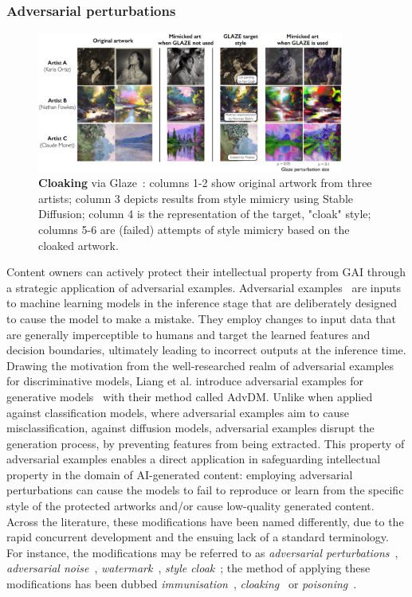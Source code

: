 \documentclass[conference,table]{IEEEtran}
\begin{document}
\subsubsection{Adversarial perturbations}\label{sec:mitigation-adversarial}
\begin{figure}[ht]
    \centering
    \includegraphics[width=0.9\textwidth]{figures/glaze.PNG}
    \caption{\textbf{Cloaking} via Glaze~\cite{shan_glaze_2023}: columns 1-2 show original artwork from three artists; column 3 depicts results from style mimicry using Stable Diffusion; column 4 is the representation of the target, "cloak" style; columns 5-6 are (failed) attempts of style mimicry based on the cloaked artwork.}
    \label{fig:cloaking}
\end{figure}
Content owners can actively protect their intellectual property from GAI through a strategic application of adversarial examples. 
Adversarial examples~\cite{goodfellow_explaining_2015} are inputs to machine learning models in the inference stage that are deliberately designed to cause the model to make a mistake. 
They employ changes to input data that are generally imperceptible to humans and target the learned features and decision boundaries, ultimately leading to incorrect outputs at the inference time. 
Drawing the motivation from the well-researched realm of adversarial examples for discriminative models, Liang et al. introduce adversarial examples for generative models~\cite{liang_adversarial_2023} with their method called AdvDM.
Unlike when applied against classification models, where adversarial examples aim to cause misclassification, against diffusion models, adversarial examples disrupt the generation process, by preventing features from being extracted. 
This property of adversarial examples enables a direct application in safeguarding intellectual property in the domain of AI-generated content: employing adversarial perturbations can cause the models to fail to reproduce or learn from the specific style of the protected artworks and/or cause low-quality generated content. 
Across the literature, these modifications have been named differently, due to the rapid concurrent development and the ensuing lack of a standard terminology. For instance, the modifications may be referred to as \textit{adversarial perturbations}~\cite{liang_adversarial_2023,liang_mist_2023}, \textit{adversarial noise}~\cite{zhao_unlearnable_2023}, \textit{watermark}~\cite{ye_duaw_2023}, \textit{style cloak}~\cite{shan_glaze_2023}; the method of applying these modifications has been dubbed \textit{immunisation}~\cite{salman_raising_2023}, \textit{cloaking}~\cite{shan_glaze_2023} or \textit{poisoning}~\cite{liu_toward_2023}. 
 
\end{document}
